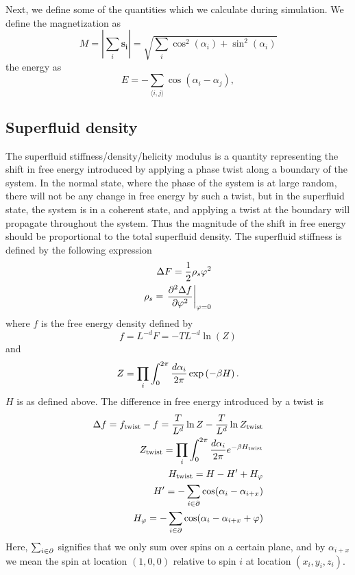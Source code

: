 Next, we define some of the quantities which we calculate during simulation.
We define the magnetization as 
\begin{equation}
  M = \left| \sum_i \bm{s_i}\right| = \sqrt{\sum_i \cos^2(\alpha_i) + \sin^2(\alpha_i)}
  \label{}
\end{equation}
the energy as 
\begin{equation}
  E = -\sum\limits_{\langle i,j \rangle} \cos(\alpha_i - \alpha_j),
  \label{}
\end{equation}

\subsection{Superfluid density}
The superfluid stiffness/density/helicity modulus is a quantity representing the shift in free energy introduced by applying a phase twist along a boundary of the system.
In the normal state, where the phase of the system is at large random, there will not be any change in free energy by such a twist, but in the superfluid state, the system is in a coherent state, and applying a twist at the boundary will propagate throughout the system. Thus the magnitude of the shift in free energy should be proportional to the total superfluid density.
The superfluid stiffness is defined by the following expression
\begin{align}
  \Delta F = \frac{1}{2}\rho_s\varphi^2 \nonumber \\
  \rho_s = \left. \frac{\partial^{2} \Delta f}{\partial \varphi^2}\right|_{\varphi =0}\label{eq_rhos}\\
\end{align}
where $f$ is the free energy density defined by
\begin{equation}
  f = L^{-d}F = -TL^{-d}\ln(Z)
  \label{}
\end{equation}
and 
\begin{equation}
  Z = \prod_{i}\int_{0}^{2\pi}\frac{d \alpha_i}{2\pi} \exp\left(-\beta H\right).
  \label{}
\end{equation}
$H$ is as defined above.
The difference in free energy introduced by a twist is
\begin{align}
  \Delta f =f_{\textrm{twist}} - f = \frac{T}{L^d}\ln Z - \frac{T}{L^d}\ln Z_{\textrm{twist}}\\
  Z_{\textrm{twist}} = \prod_{i}\int_{0}^{2\pi}\frac{d \alpha_i}{2\pi} e^{-\beta H_{\textrm{twist}}}\\
  H_{\textrm{twist}} = H - H' + H_\varphi \\
  H' = -\sum_{i\in\partial} \cos(\alpha_i -\alpha_{i+x} )\\
  H_\varphi = -\sum_{i\in\partial} \cos(\alpha_i -\alpha_{i+x}+\varphi )\\
  \label{}
\end{align}
Here, $\sum_{i\in\partial}$ signifies that we only sum over spins on a certain plane, and by $\alpha_{i+x}$ we mean the spin at location $(1,0,0)$ relative to spin $i$ at location $(x_i,y_i,z_i)$.

